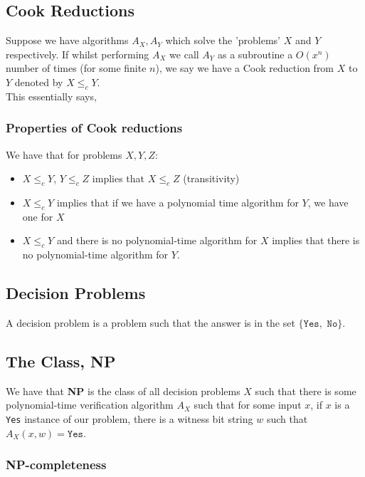\documentclass[a4paper, 12pt, twoside]{article}
\begin{document}
\subsection{Cook Reductions}

Suppose we have algorithms $A_X, A_Y$ which solve the 'problems' $X$ and $Y$
respectively. If whilst performing $A_X$ we call $A_Y$ as a subroutine a
$O(x^n)$ number of times (for some finite $n$), we say
we have a Cook reduction from $X$ to $Y$ denoted by $X \leq_c Y$.
\\[\baselineskip]
This essentially says, 

\subsubsection{Properties of Cook reductions}

We have that for problems $X, Y, Z$: \begin{itemize}
  \item $X \leq_c Y$, $Y \leq_c Z$ implies that $X \leq_c Z$ (transitivity)
  \item $X \leq_c Y$ implies that if we have a polynomial time algorithm for $Y$, 
  we have one for $X$
  \item $X \leq_c Y$ and there is no polynomial-time algorithm for $X$ implies 
  that there is no polynomial-time algorithm for $Y$.
\end{itemize}

\subsection{Decision Problems}

A decision problem is a problem such that the answer is in the set $\{\texttt{Yes},
\texttt{ No}\}$.

\subsection{The Class, \textbf{NP}}

We have that \textbf{NP} is the class of all decision problems $X$ such that there is some
polynomial-time verification algorithm $A_X$ such that for some input $x$, 
if $x$ is a \texttt{Yes} instance of our problem, there is a witness bit string $w$
such that $A_X(x, w) = \texttt{Yes}$.

\subsubsection{\textbf{NP}-completeness}
\end{document}
